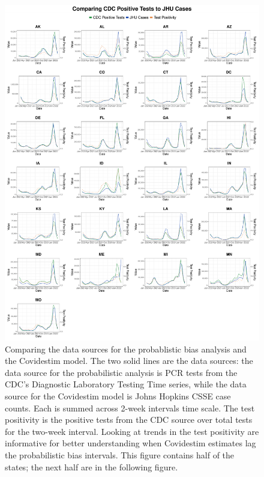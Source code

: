 \documentclass[12pt,twoside]{smiththesis}
\begin{document}
\begin{figure}

{\centering \includegraphics[width=1\linewidth]{figure/jhu_cdc_all_states_1} 

}

\caption{\label{fig:jhu-cdc-all}Comparing the data sources for the probablistic bias analysis and the Covidestim model. The two solid lines are the data sources: the data source for the probabilistic analysis is PCR tests from the CDC's Diagnostic Laboratory Testing Time series, while the data source for the Covidestim model is Johns Hopkins CSSE case counts. Each is summed across 2-week intervals time scale. The test positivity is the positive tests from the CDC source over total tests for the two-week interval. Looking at trends in the test positivity are informative for better understanding when Covidestim estimates lag the probabilistic bias intervals. This figure contains half of the states; the next half are in the following figure.}\label{fig:unnamed-chunk-108}
\end{figure}
\end{document}
